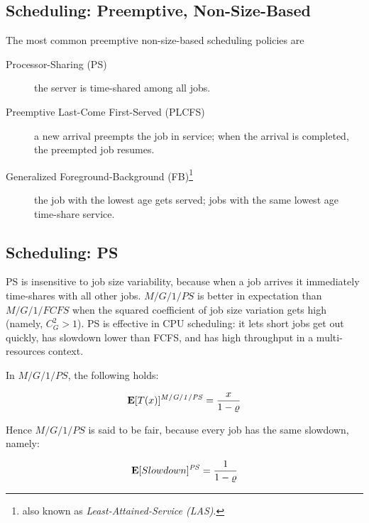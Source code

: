 \subsection{Scheduling: Preemptive, Non-Size-Based}
\label{sec:Scheduling-Preemptive-Non-Size-Based}

The most common preemptive non-size-based scheduling policies are

\begin{description}
	
	\item [Processor-Sharing (PS)] the server is time-shared among all jobs.
	
	\item [Preemptive Last-Come First-Served (PLCFS)] a new arrival preempts the job in service; when the arrival is completed, the preempted job resumes.
	
	\item [Generalized Foreground-Background (FB)\footnote{also known as \textit{Least-Attained-Service (LAS)}.}] the job with the lowest age gets served; jobs with the same lowest age time-share service.
	
\end{description}




\subsection{Scheduling: PS}
\label{sec:Scheduling-PS}
PS is insensitive to job size variability, because when a job arrives it immediately time-shares with all other jobs.
$M/G/1/PS$ is better in expectation than $M/G/1/FCFS$ when the squared coefficient of job size variation gets high (namely, $C_{G}^{2}>1$).
PS is effective in CPU scheduling: it lets short jobs get out quickly, has slowdown lower than FCFS, and has high throughput in a  multi-resources context.

In $M/G/1/PS$, the following holds:

\begin{equation}
\label{eqn:PS-Mean-Response-Time}
\expected{T(x)}^{\mathit{M/G/1/PS}}=\frac{x}{1-\varrho}
\end{equation}

Hence $M/G/1/PS$ is said to be fair, because every job has the same slowdown, namely:

\begin{equation}
\label{eqn:PS-Mean-Slowdown}
\expected{Slowdown}^{\mathit{PS}}=\frac{1}{1-\varrho}
\end{equation}

